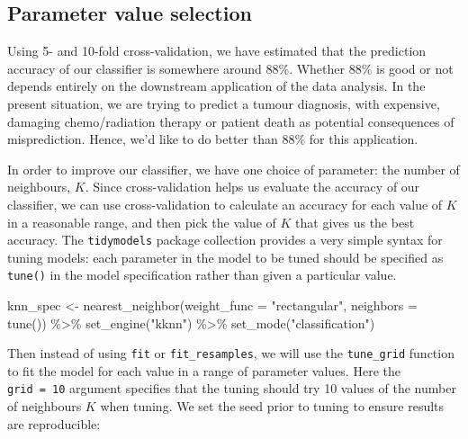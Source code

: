 \documentclass[
]{krantz}
\makeatletter
\newenvironment{Shaded}{\begin{snugshade}}{\end{snugshade}}
\newcommand{\AttributeTok}[1]{\textcolor[rgb]{0.61,0.61,0.61}{#1}}
\newcommand{\FunctionTok}[1]{\textcolor[rgb]{0,0,0}{#1}}
\newcommand{\NormalTok}[1]{#1}
\newcommand{\OtherTok}[1]{\textcolor[rgb]{0.37,0.37,0.37}{#1}}
\newcommand{\SpecialCharTok}[1]{\textcolor[rgb]{0,0,0}{#1}}
\newcommand{\StringTok}[1]{\textcolor[rgb]{0.5,0.5,0.5}{#1}}
\newenvironment{kframe}{%
\medskip{}
\setlength{\fboxsep}{.8em}
 \def\at@end@of@kframe{}%
 \ifinner\ifhmode%
  \def\at@end@of@kframe{\end{minipage}}%
  \begin{minipage}{\columnwidth}%
 \fi\fi%
 \def\FrameCommand##1{\hskip\@totalleftmargin \hskip-\fboxsep
 \colorbox{shadecolor}{##1}\hskip-\fboxsep
     \hskip-\linewidth \hskip-\@totalleftmargin \hskip\columnwidth}%
 \MakeFramed {\advance\hsize-\width
   \@totalleftmargin\z@ \linewidth\hsize
   \@setminipage}}%
 {\par\unskip\endMakeFramed%
 \at@end@of@kframe}
\renewenvironment{Shaded}{\begin{kframe}}{\end{kframe}}
\makeatother
\begin{document}
\hypertarget{parameter-value-selection}{%
\subsection{Parameter value selection}\label{parameter-value-selection}}

Using 5- and 10-fold cross-validation, we have estimated that the prediction
accuracy of our classifier is somewhere around 88\%. Whether 88\% is good or not
depends entirely on the downstream application of the data analysis. In the
present situation, we are trying to predict a tumour diagnosis, with expensive,
damaging chemo/radiation therapy or patient death as potential consequences of
misprediction. Hence, we'd like to do better than 88\% for this application.

In order to improve our classifier, we have one choice of parameter: the number of
neighbours, \(K\). Since cross-validation helps us evaluate the accuracy of our
classifier, we can use cross-validation to calculate an accuracy for each value
of \(K\) in a reasonable range, and then pick the value of \(K\) that gives us the
best accuracy. The \texttt{tidymodels} package collection provides a very simple
syntax for tuning models: each parameter in the model to be tuned should be specified
as \texttt{tune()} in the model specification rather than given a particular value.

\begin{Shaded}
\begin{Highlighting}[]
\NormalTok{knn\_spec }\OtherTok{\textless{}{-}} \FunctionTok{nearest\_neighbor}\NormalTok{(}\AttributeTok{weight\_func =} \StringTok{"rectangular"}\NormalTok{, }\AttributeTok{neighbors =} \FunctionTok{tune}\NormalTok{()) }\SpecialCharTok{\%\textgreater{}\%}
  \FunctionTok{set\_engine}\NormalTok{(}\StringTok{"kknn"}\NormalTok{) }\SpecialCharTok{\%\textgreater{}\%}
  \FunctionTok{set\_mode}\NormalTok{(}\StringTok{"classification"}\NormalTok{)}
\end{Highlighting}
\end{Shaded}

Then instead of using \texttt{fit} or \texttt{fit\_resamples}, we will use the \texttt{tune\_grid} function
to fit the model for each value in a range of parameter values. Here the \texttt{grid\ =\ 10}
argument specifies that the tuning should try 10 values of the number of neighbours
\(K\) when tuning. We set the seed prior to tuning to ensure results are reproducible:
\end{document}
